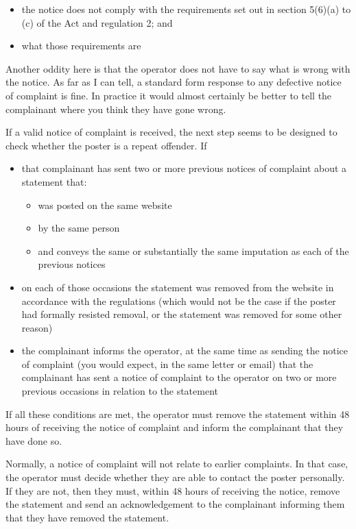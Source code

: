 \documentclass[]{article}
\begin{document}
\begin{itemize}
\item the notice does not comply with the requirements set out in section 5(6)(a) to (c) of the Act and regulation 2; and
\item what those requirements are
\end{itemize}

Another oddity here is that the operator does not have to say what is wrong with the notice. As far as I can tell, a standard form response to any defective notice of complaint is fine. In practice it would almost certainly be better to tell the complainant where you think they have gone wrong.

If a valid notice of complaint is received, the next step seems to be designed to check whether the poster is a repeat offender. If

\begin{itemize}
\item that complainant has sent two or more previous notices of complaint about a statement that:
  \begin{itemize}
  \item was posted on the same website
  \item by the same person
  \item and conveys the same or substantially the same imputation as each of the previous notices
  \end{itemize}
\item on each of those occasions the statement was removed from the website in accordance with the regulations (which would not be the case if the poster had formally resisted removal, or the statement was removed for some other reason)
\item the complainant informs the operator, at the same time as sending the notice of complaint (you would expect, in the same letter or email) that the complainant has sent a notice of complaint to the operator on two or more previous occasions in relation to the statement
\end{itemize}

If all these conditions are met, the operator must remove the statement within 48 hours of receiving the notice of complaint and inform the complainant that they have done so.

Normally, a notice of complaint will not relate to earlier complaints. In that case, the operator must decide whether they are able to contact the poster personally. If they are not, then they must, within 48 hours of receiving the notice, remove the statement and send an acknowledgement to the complainant informing them that they have removed the statement.
\end{document}
